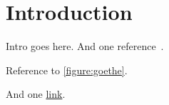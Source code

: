 \section{Introduction}

	Intro goes here.
	And one reference~\cite{practical-ore}.

	

	Reference to \cref{figure:goethe}.

	And one \href{https://dbogatov.org}{link}.
